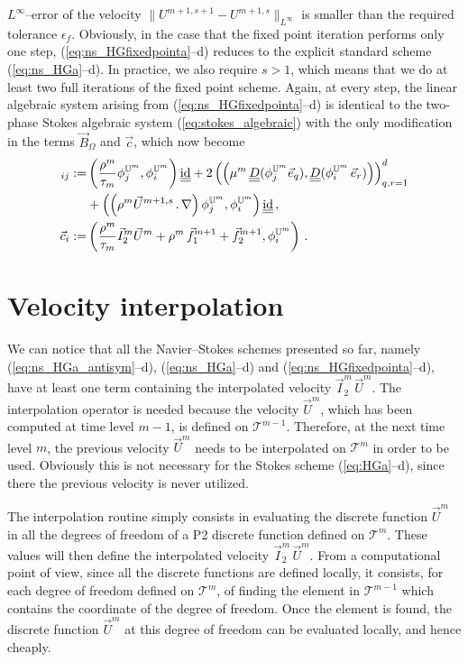 $L^\infty$--error of the velocity $\|U^{m+1,s+1}-U^{m+1,s} \|_{L^\infty}$ is
smaller than the required tolerance $\epsilon_f$. Obviously, in the case that
the fixed point iteration performs only one step,
(\ref{eq:ns_HGfixedpointa}--d) reduces to the explicit standard scheme
(\ref{eq:ns_HGa}--d). In practice, we also require $s>1$, which means that we
do at least two full iterations of the fixed point scheme. Again, at every
step, the linear algebraic system arising from (\ref{eq:ns_HGfixedpointa}--d)
is identical to the two-phase Stokes algebraic system
(\ref{eq:stokes_algebraic}) with the only modification in the terms
$\vec B_{\Omega}$ and $\vec c$, which now become
\begin{align*}
[\vec B_\Omega]_{ij} := & \left( \frac{\rho^m}{\tau_m} \phi_j^{\uspacesimple^m},
\phi_i^{\uspacesimple^m} \right)\mat \id
+ 2\left(\left(\mu^m\,\mat D(\phi_j^{\uspacesimple^m} \vec e_q),
\mat D(\phi_i^{\uspacesimple^m}\,\vec e_r) \right) \right)_{q,r=1}^d\\
& + \left( \left(\rho^m \vec U^{m+1,s}\,.\,\nabla \right)
\phi_j^{\uspacesimple^m},
\phi_i^{\uspacesimple^m} \right)\mat \id \,,\\
\vec c_i := &\left( \frac{\rho^m}{\tau_m}\vec I_2^m\vec U^m +
\rho^m\,\vec f_1^{m+1}+\vec f_2^{m+1},\phi_i^{\uspacesimple^m}\right)\,.
\end{align*}

\section{Velocity interpolation}\label{sec:ns_velocity_interpolation}
We can notice that all the Navier--Stokes schemes presented so far, namely
(\ref{eq:ns_HGa_antisym}--d), (\ref{eq:ns_HGa}--d) and
(\ref{eq:ns_HGfixedpointa}--d), have at least one term containing the
interpolated velocity $\vec I^m_2\,\vec U^m$. The interpolation operator is
needed because the velocity $\vec U^m$, which has been computed at time level
$m-1$, is defined on $\mathcal{T}^{m-1}$. 
Therefore, at the next time level $m$, the
previous velocity $\vec U^m$ needs to be interpolated on $\mathcal{T}^m$ 
in order to be used. Obviously this is not necessary for the Stokes scheme
(\ref{eq:HGa}--d), since there the previous velocity is never utilized.

The interpolation routine simply consists in evaluating the discrete function
$\vec U^m$ in all the degrees of freedom of a P2 discrete function defined on
$\mathcal{T}^m$. These values will then define the interpolated velocity
$\vec I^m_2\,\vec U^m$. From a computational point of view, since all the
discrete functions are defined locally, it consists, for each degree of
freedom defined on $\mathcal{T}^m$, of finding the element in 
$\mathcal{T}^{m-1}$ which contains the coordinate of the degree of freedom. 
Once the element is found, the discrete function $\vec U^m$ at this degree of
freedom can be evaluated locally, and hence cheaply.

